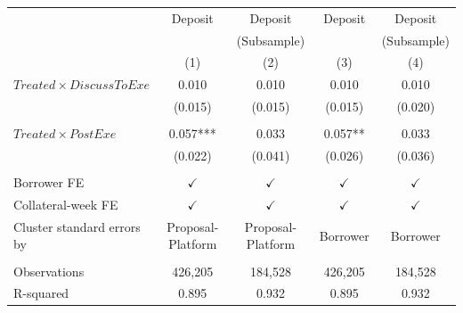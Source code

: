 \begin{landscape}
\begin{table}[ht!]
\begin{tabular*}{\linewidth}{@{\extracolsep{\fill}}lcccc }
          & Deposit & Deposit & Deposit & Deposit \\
          &       & (Subsample) &       & (Subsample) \\
          & (1)   & (2)   & (3)   & (4) \\
\cmidrule{2-5}   $Treated \times DiscussToExe$ & 0.010 & 0.010 & 0.010 & 0.010 \\
          & (0.015) & (0.015) & (0.015) & (0.020) \\
          &       &       &       &  \\
   $Treated \times PostExe$ & 0.057*** & 0.033 & 0.057** & 0.033 \\
          & (0.022) & (0.041) & (0.026) & (0.036) \\
          &       &       &       &  \\
    Borrower FE &    $\checkmark$   &  $\checkmark$     &  $\checkmark$     & $\checkmark$ \\
    Collateral-week FE &  $\checkmark$     &    $\checkmark$   &  $\checkmark$     &$\checkmark$  \\
        Cluster standard errors by & Proposal-Platform & Proposal-Platform & Borrower & Borrower \\
          &       &       &       &  \\
    Observations & 426,205 & 184,528 & 426,205 & 184,528 \\
    R-squared & 0.895 & 0.932 & 0.895 & 0.932 \\
    \bottomrule
          \end{tabular*} 



\end{table}%

\end{landscape}

\clearpage
\newpage


